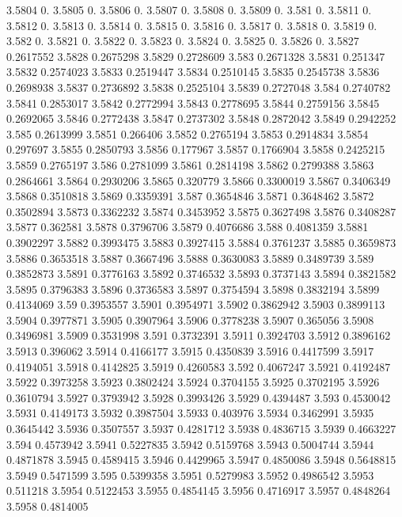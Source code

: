 3.5804  0.
3.5805  0.
3.5806  0.
3.5807  0.
3.5808  0.
3.5809  0.
3.581  0.
3.5811  0.
3.5812  0.
3.5813  0.
3.5814  0.
3.5815  0.
3.5816  0.
3.5817  0.
3.5818  0.
3.5819  0.
3.582  0.
3.5821  0.
3.5822  0.
3.5823  0.
3.5824  0.
3.5825  0.
3.5826  0.
3.5827  0.2617552
3.5828  0.2675298
3.5829  0.2728609
3.583  0.2671328
3.5831  0.251347
3.5832  0.2574023
3.5833  0.2519447
3.5834  0.2510145
3.5835  0.2545738
3.5836  0.2698938
3.5837  0.2736892
3.5838  0.2525104
3.5839  0.2727048
3.584  0.2740782
3.5841  0.2853017
3.5842  0.2772994
3.5843  0.2778695
3.5844  0.2759156
3.5845  0.2692065
3.5846  0.2772438
3.5847  0.2737302
3.5848  0.2872042
3.5849  0.2942252
3.585  0.2613999
3.5851  0.266406
3.5852  0.2765194
3.5853  0.2914834
3.5854  0.297697
3.5855  0.2850793
3.5856  0.177967
3.5857  0.1766904
3.5858  0.2425215
3.5859  0.2765197
3.586  0.2781099
3.5861  0.2814198
3.5862  0.2799388
3.5863  0.2864661
3.5864  0.2930206
3.5865  0.320779
3.5866  0.3300019
3.5867  0.3406349
3.5868  0.3510818
3.5869  0.3359391
3.587  0.3654846
3.5871  0.3648462
3.5872  0.3502894
3.5873  0.3362232
3.5874  0.3453952
3.5875  0.3627498
3.5876  0.3408287
3.5877  0.362581
3.5878  0.3796706
3.5879  0.4076686
3.588  0.4081359
3.5881  0.3902297
3.5882  0.3993475
3.5883  0.3927415
3.5884  0.3761237
3.5885  0.3659873
3.5886  0.3653518
3.5887  0.3667496
3.5888  0.3630083
3.5889  0.3489739
3.589  0.3852873
3.5891  0.3776163
3.5892  0.3746532
3.5893  0.3737143
3.5894  0.3821582
3.5895  0.3796383
3.5896  0.3736583
3.5897  0.3754594
3.5898  0.3832194
3.5899  0.4134069
3.59  0.3953557
3.5901  0.3954971
3.5902  0.3862942
3.5903  0.3899113
3.5904  0.3977871
3.5905  0.3907964
3.5906  0.3778238
3.5907  0.365056
3.5908  0.3496981
3.5909  0.3531998
3.591  0.3732391
3.5911  0.3924703
3.5912  0.3896162
3.5913  0.396062
3.5914  0.4166177
3.5915  0.4350839
3.5916  0.4417599
3.5917  0.4194051
3.5918  0.4142825
3.5919  0.4260583
3.592  0.4067247
3.5921  0.4192487
3.5922  0.3973258
3.5923  0.3802424
3.5924  0.3704155
3.5925  0.3702195
3.5926  0.3610794
3.5927  0.3793942
3.5928  0.3993426
3.5929  0.4394487
3.593  0.4530042
3.5931  0.4149173
3.5932  0.3987504
3.5933  0.403976
3.5934  0.3462991
3.5935  0.3645442
3.5936  0.3507557
3.5937  0.4281712
3.5938  0.4836715
3.5939  0.4663227
3.594  0.4573942
3.5941  0.5227835
3.5942  0.5159768
3.5943  0.5004744
3.5944  0.4871878
3.5945  0.4589415
3.5946  0.4429965
3.5947  0.4850086
3.5948  0.5648815
3.5949  0.5471599
3.595  0.5399358
3.5951  0.5279983
3.5952  0.4986542
3.5953  0.511218
3.5954  0.5122453
3.5955  0.4854145
3.5956  0.4716917
3.5957  0.4848264
3.5958  0.4814005
